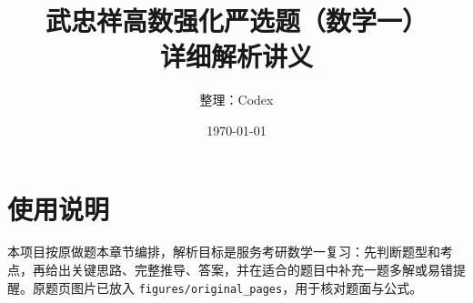 \documentclass[UTF8,12pt,a4paper]{ctexbook}
\title{武忠祥高数强化严选题（数学一）\\详细解析讲义}
\author{整理：Codex}
\date{\today}
\begin{document}
\maketitle
\tableofcontents

\chapter*{使用说明}
本项目按原做题本章节编排，解析目标是服务考研数学一复习：先判断题型和考点，再给出关键思路、完整推导、答案，并在适合的题目中补充一题多解或易错提醒。原题页图片已放入 \verb|figures/original_pages|，用于核对题面与公式。










\end{document}
